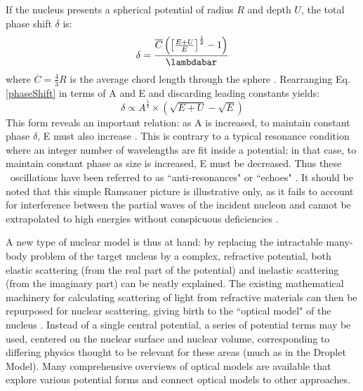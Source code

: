 If the nucleus presents a spherical potential of radius $R$ and depth $U$, the total phase shift $\delta$ is:
\begin{equation} \label{phaseShift}
    \delta =
    \frac{\overline{C}\left(\left[{\frac{E+U}{E}}\right]^{\frac{1}{2}}-1\right)}{\lambdabar}
\end{equation}
where $\overline{C} = \frac{4}{3}R$ is the average chord length through the
sphere \cite{Angeli1970}. Rearranging Eq. \ref{phaseShift} in terms of A and E and
discarding leading constants yields:
\begin{equation}
    \delta \propto A^{\frac{1}{3}}\times\left(\sqrt{E+U}-\sqrt{E}\right)
\end{equation}
This form reveals an important relation: as A is increased, to maintain constant 
phase $\delta$, E must also increase \cite{Satchler1980, Peterson1962}. 
This is contrary to a typical resonance condition where an integer number of wavelengths
are fit inside a potential; in that case, to maintain constant phase as size is increased,
E must be decreased. Thus these \tot\ oscillations have been referred to as
``anti-resonances" or ``echoes" \cite{Satchler1980, McVoy1967}. It should be
noted that this simple Ramsauer picture is illustrative only, as it fails to
account for interference between the partial waves of the incident nucleon and
cannot be extrapolated to high energies without conspicuous deficiencies
\cite{Ahmad1973}.

A new type of nuclear model is thus at hand:
by replacing the intractable many-body problem
of the target nucleus by a complex, refractive potential, both elastic scattering (from the real 
part of the potential) and inelastic scattering (from the imaginary part) can be neatly 
explained. The existing mathematical machinery for calculating scattering of light from
refractive materials can then be repurposed for nuclear scattering, giving birth to
the ``optical model" of the nucleus \cite{Feshbach1958, McVoy1967}.
Instead of a single central potential, a series
of potential terms may be used,
centered on the nuclear surface and nuclear volume,
corresponding to differing physics thought to be relevant for these areas (much
as in the Droplet Model). Many comprehensive overviews of optical models are
available \cite{Dickhoff2018, Hodgson1971} that explore various potential forms
and connect optical models to other approaches.

